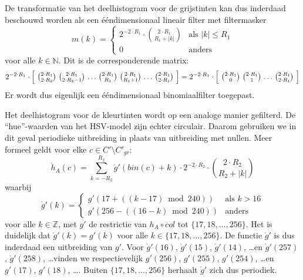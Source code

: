 De transformatie van het deelhistogram voor de grijstinten kan dus inderdaad beschouwd worden
als een \'e\'endimensionaal lineair filter met filtermasker 
\begin{displaymath}
m(k)= \begin{cases}
2^{-2 \cdot R_1} \cdot \binom{2 \cdot R_1}{R_1+|k|} & \textrm{als } |k| \le R_1 \\ 
0 & \textrm{anders} 
\end{cases}
\end{displaymath}
voor alle $k \in \mathbb{N}$. Dit is de corresponderende matrix: 
\begin{displaymath}
2^{-2 \cdot R_1} \cdot \left[ \begin{array}{@{\ }c@{\ }c@{\ }c@{\ }c@{\ }c@{\ }c@{\ }c@{\ }} \binom{2 \cdot R_1}{2\cdot R_2} & \binom{2 \cdot R_1}{2\cdot R_2 -1} & 
\ldots & \binom{2\cdot R_1}{R_1} & \binom{2\cdot R_1}{R_1+1} & \ldots &
\binom{2\cdot R_1}{2\cdot R_1} \end{array} \right] =
2^{-2 \cdot R_1} \cdot \left[ \begin{array}{@{\ }c@{\ }c@{\ }c@{\ }c@{\ }} \binom{2 \cdot R_1}{0} & \binom{2 \cdot R_1}{1} & 
\ldots & \binom{2\cdot R_1}{2\cdot R_1} \end{array} \right]
\end{displaymath}
Er wordt dus eigenlijk een \'e\'endimensionaal binomiaalfilter toegepast.

Het deelhistogram voor de kleurtinten wordt op een analoge manier gefilterd. 
De ``hue''-waarden van het HSV-model zijn echter circulair. Daarom gebruiken we in dit geval
periodieke uitbreiding in plaats van uitbreiding met nullen. Meer formeel geldt voor 
elke $c \in C' \setminus C'_{gr}$:
\begin{displaymath}
\mathring{h}_A(c) = \sum_{k=-R_2}^{R_2} \mathring{g}'(bin(c)+k) \cdot 2^{-2 \cdot R_2} \cdot \binom{2 \cdot R_2}{R_2+|k|}
\end{displaymath}
waarbij
\begin{displaymath}
\mathring{g}'(k) = \begin{cases}
g'(17  + ((k-17) \bmod 240)) & \textrm{als } k > 16 \\
g'(256 - ((16-k) \bmod 240)) & \textrm{anders}
\end{cases}
\end{displaymath}
voor alle $k \in \mathbb{Z}$, met $g'$ de restrictie van $h_A \circ col$
tot $\{17,18,\ldots,256\}$. Het is duidelijk dat $\mathring{g}'(k)=g'(k)$ voor alle 
$k \in \{17,18,\ldots,256\}$. De functie $\mathring{g}'$ is dus inderdaad een uitbreiding
van $g'$. Voor $\mathring{g}'(16)$, $\mathring{g}'(15)$, $\mathring{g}'(14)$, \ldots en
$\mathring{g}'(257)$, $\mathring{g}'(258)$, \ldots vinden we respectievelijk
$g'(256)$, $g'(255)$, $g'(254)$, \ldots en $g'(17)$, $g'(18)$, \ldots . Buiten
$\{17,18,\ldots,256\}$ herhaalt $\mathring{g}'$ zich dus periodiek. 

